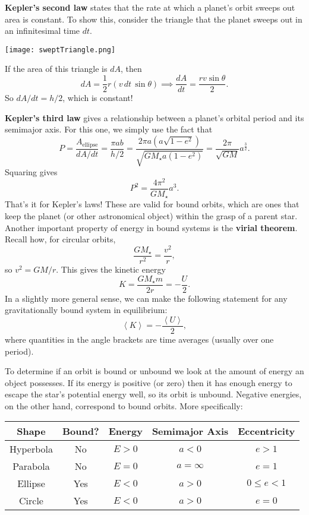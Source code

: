 \documentclass[../a062main.tex]{subfiles}
\begin{document}
\textbf{Kepler's second law} states that the rate at which a planet's orbit sweeps out area is constant.
To show this, consider the triangle that the planet sweeps out in an infinitesimal time $dt$.
\begin{center}
    \texttt{[image: sweptTriangle.png]}
\end{center}
If the area of this triangle is $dA$, then
\[ dA = \frac{1}{2} r (v \,dt \,\sin \theta) \implies \frac{dA}{dt} = \frac{rv \sin \theta}{2}. \]
So $\boxed{dA/dt = h/2}$, which is constant!

\textbf{Kepler's third law} gives a relationship between a planet's orbital period and its semimajor axis.
For this one, we simply use the fact that
\[ P = \frac{A_\textrm{ellipse}}{dA/dt} = \frac{\pi ab}{h/2} = \frac{2 \pi a (a \sqrt{1 - e^2})}{\sqrt{GM_\star a (1-e^2)}} = \frac{2 \pi}{\sqrt{GM}} a^{\frac{3}{2}}. \]
Squaring gives
\[ \boxed{P^2 = \frac{4 \pi^2}{GM_\star} a^3}. \]
That's it for Kepler's laws!
These are valid for bound orbits, which are ones that keep the planet (or other astronomical object) within the grasp of a parent star.
Another important property of energy in bound systems is the \textbf{virial theorem}.
Recall how, for circular orbits,
\[ \frac{GM_\star}{r^2} = \frac{v^2}{r}, \]
so $v^2 = GM/r$.
This gives the kinetic energy
\[ K = \frac{GM_\star m}{2r} = -\frac{U}{2}. \]
In a slightly more general sense, we can make the following statement for any gravitationally bound system in equilibrium:
\[ \boxed{\left< K \right> = -\frac{\left< U \right>}{2}}, \]
where quantities in the angle brackets are time averages (usually over one period).

To determine if an orbit is bound or unbound we look at the amount of energy an object possesses.
If its energy is positive (or zero) then it has enough energy to escape the star's potential energy well, so its orbit is unbound.
Negative energies, on the other hand, correspond to bound orbits.
More specifically:

\begin{center}
\begin{tabular}{c|c|c|c|c}
    Shape & Bound? & Energy & Semimajor Axis & Eccentricity \\ \hline
    Hyperbola & No & $E > 0$ & $a < 0$ & $e > 1$ \\
    Parabola & No & $E = 0$ & $a = \infty$ & $e = 1$ \\
    Ellipse & Yes & $E < 0$ & $a > 0$ & $0 \leq e < 1$ \\
    Circle & Yes & $E < 0$ & $a > 0$ & $e = 0$
\end{tabular}
\end{center}
\end{document}
